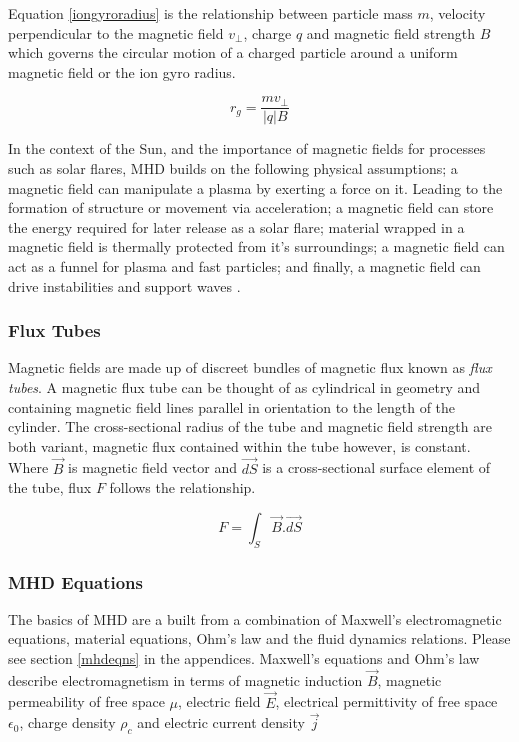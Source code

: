 Equation \ref{iongyroradius} is the relationship between particle mass $m$, velocity perpendicular to the magnetic field $v_{\bot}$, charge $q$ and magnetic field strength $B$  which governs the circular motion of a charged particle around a uniform magnetic field or the ion gyro radius. 

\begin{equation}\label{iongyroradius}
r_{g}=\frac{mv_{\bot}}{|q|B}
\end{equation}

In the context of the Sun, and the importance of magnetic fields for processes such as solar flares, MHD builds on the following physical assumptions; a magnetic field can manipulate a plasma by exerting a force on it. Leading to the formation of structure or movement via acceleration; a magnetic field can store the energy required for later release as a solar flare; material wrapped in a magnetic field is thermally protected from it's surroundings; a magnetic field can act as a funnel for plasma and fast particles; and finally, a magnetic field can drive instabilities and support waves \citep{2003dysu.book.....D}.

\subsubsection{Flux Tubes}
Magnetic fields are made up of discreet bundles of magnetic flux known as \emph{flux tubes}. A magnetic flux tube can be thought of as cylindrical in geometry and containing magnetic field lines parallel in orientation to the length of the cylinder. The cross-sectional radius of the tube and magnetic field strength are both variant, magnetic flux contained within the tube however, is constant. Where $\vec{B}$ is magnetic field vector and $\vec{dS}$ is a cross-sectional surface element of the tube, flux $F$ follows the relationship.

\begin{equation}\label{fluxtube}       
F = \int_{S} \vec{B}.\vec{dS}
\end{equation}


\subsubsection{MHD Equations}
The basics of MHD are a built from a combination of Maxwell's electromagnetic equations, material equations, Ohm's law and the fluid dynamics relations. Please see section \ref{mhdeqns} in the appendices. Maxwell's equations and Ohm's law describe electromagnetism in terms of magnetic induction $\vec{B}$, magnetic permeability of free space $\mu$, electric field $\vec{E}$, electrical permittivity of free space $\epsilon_{0}$, charge density $\rho_{c}$ and electric current density $\vec{j}$ \\ 

